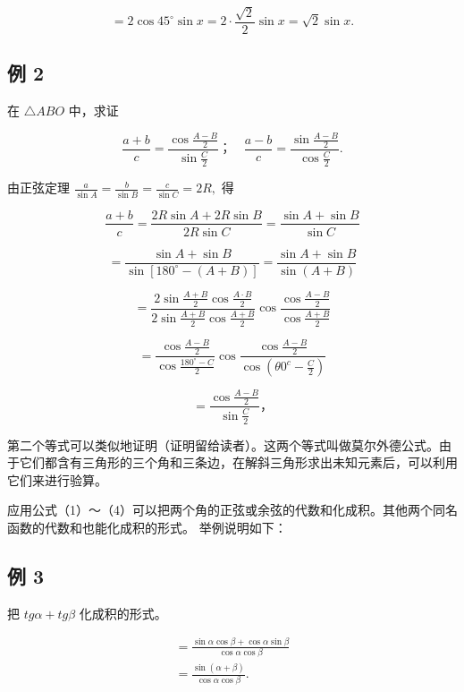 \[
= 2 \cos 45 ^{\circ} \sin x = 2 \cdot \frac {\sqrt {2}}{2} \sin x = \sqrt {2} \sin x.
\]

\subsection{例 2}

在 \(\triangle ABO\) 中，求证

\[
\frac {a + b}{c} = \frac {\cos \frac {A - B}{2}}{\sin \frac {C}{2}}\text{；} \quad \frac {a - b}{c} = \frac {\sin \frac {A - B}{2}}{\cos \frac {C}{2}}.
\]

 由正弦定理
\(\frac{a}{\sin A} = \frac{b}{\sin B} = \frac{c}{\sin C} = 2R,\) 得

\[
\frac{a+b}{c} = \frac {2 R \sin A + 2 R \sin B}{2 R \sin C} = \frac {\sin A + \sin B}{\sin C}
\]

\[
= \frac {\sin A + \sin B}{\sin [ 180 ^{\circ} - (A + B) ]} = \frac {\sin A + \sin B}{\sin (A + B)}
\]

\[
= \frac {2 \sin \frac {A + B}{2} \cos \frac {A \cdot B}{2}}{2 \sin \frac {A + B}{2} \cos \frac {A + B}{2}} \cos \frac {\cos \frac {A - B}{2}}{\cos \frac {A + B}{2}}
\]

\[
= \frac {\cos \frac {A - B}{2}}{\cos \frac {180 ^{\circ} - C}{2}} \cos \frac {\cos \frac {A - B}{2}}{\cos \left(\theta 0 ^ {c} - \frac {C}{2}\right)}
\]

\[
= \frac {\cos \frac {A - B}{2}}{\sin \frac {C}{2}}\text{，}
\]

第二个等式可以类似地证明（证明留给读者）。这两个等式叫做莫尔外德公式。由于它们都含有三角形的三个角和三条边，在解斜三角形求出未知元素后，可以利用它们来进行验算。

应用公式（1）～（4）可以把两个角的正弦或余弦的代数和化成积。其他两个同名函数的代数和也能化成积的形式。
举例说明如下：

\subsection{例 3}

把 \(tg\alpha + tg\beta\) 化成积的形式。

\[
\begin{array}{l} = \frac {\sin \alpha \cos \beta + \cos \alpha \sin \beta}{\cos \alpha \cos \beta} \\ = \frac {\sin (\alpha + \beta)}{\cos \alpha \cos \beta}. \\ \end{array}
\]

